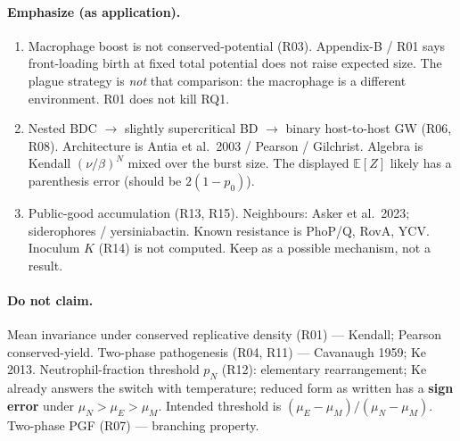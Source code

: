 \documentclass[11pt,a4paper]{report}
\begin{document}
\paragraph{Emphasize (as application).}
\begin{enumerate}
\item Macrophage boost is not conserved-potential (R03). Appendix-B / R01
  says front-loading birth at fixed total potential does not raise
  expected size. The plague strategy is \emph{not} that comparison: the
  macrophage is a different environment. R01 does not kill RQ1.
\item Nested BDC \(\to\) slightly supercritical BD \(\to\) binary
  host-to-host GW (R06, R08). Architecture is Antia et al.\ 2003 /
  Pearson / Gilchrist. Algebra is Kendall \((\nu/\beta)^N\) mixed over
  the burst size. The displayed \(\mathbb{E}[Z]\) likely has a
  parenthesis error (should be \(2(1-p_0)\)).
\item Public-good accumulation (R13, R15). Neighbours: Asker et al.\
  2023; siderophores / yersiniabactin. Known resistance is PhoP/Q, RovA,
  YCV. Inoculum \(K\) (R14) is not computed. Keep as a possible
  mechanism, not a result.
\end{enumerate}

\paragraph{Do not claim.}
Mean invariance under conserved replicative density (R01) --- Kendall;
Pearson conserved-yield. Two-phase pathogenesis (R04, R11) --- Cavanaugh
1959; Ke 2013. Neutrophil-fraction threshold \(p_N\) (R12): elementary
rearrangement; Ke already answers the switch with temperature; reduced
form as written has a \textbf{sign error} under
\(\mu_N>\mu_E>\mu_M\). Intended threshold is
\((\mu_E-\mu_M)/(\mu_N-\mu_M)\). Two-phase PGF (R07) --- branching
property.
\end{document}
